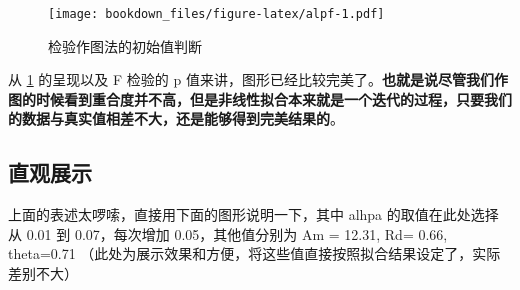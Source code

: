 \documentclass[]{krantz}
\theoremstyle{definition}
\theoremstyle{definition}
\theoremstyle{definition}
\theoremstyle{remark}
\begin{document}
\begin{figure}
\centering
\texttt{[image: bookdown\_files/figure-latex/alpf-1.pdf]}
\caption{\label{fig:alpf}检验作图法的初始值判断}
\end{figure}

从 \ref{fig:alpf} 的呈现以及 F 检验的 p
值来讲，图形已经比较完美了。\textbf{也就是说尽管我们作图的时候看到重合度并不高，但是非线性拟合本来就是一个迭代的过程，只要我们的数据与真实值相差不大，还是能够得到完美结果的}。

\subsection{直观展示}\label{show_demo}

上面的表述太啰嗦，直接用下面的图形说明一下，其中 alhpa
的取值在此处选择从 0.01 到 0.07，每次增加 0.05，其他值分别为 Am = 12.31,
Rd= 0.66, theta=0.71
（此处为展示效果和方便，将这些值直接按照拟合结果设定了，实际差别不大）
\end{document}
